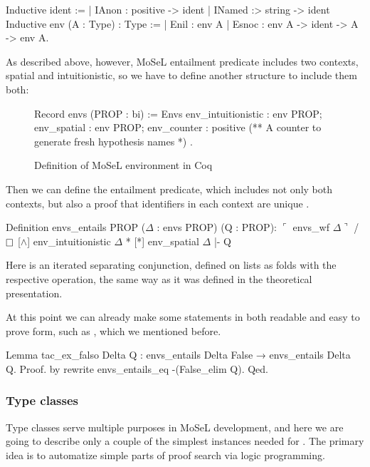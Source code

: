 \begin{coq}
Inductive ident :=
  | IAnon : positive -> ident
  | INamed :> string -> ident
Inductive env (A : Type) : Type :=
  | Enil : env A
  | Esnoc : env A -> ident -> A -> env A.
\end{coq}

As described above, however, MoSeL entailment predicate includes two contexts, spatial and intuitionistic, so we have to define another structure to include them both:

\begin{figure}[H]
\centering
\begin{coq}
Record envs (PROP : bi) := Envs {
  env_intuitionistic : env PROP;
  env_spatial : env PROP;
  env_counter : positive (** A counter to generate fresh hypothesis names *)
}.
\end{coq}
\caption{Definition of MoSeL environment in Coq}
\label{fig:coq_envs}
\end{figure}


Then we can define the entailment predicate, which includes not only both contexts, but also a proof that identifiers in each context are unique .
\begin{coq}
  Definition envs_entails {PROP} ($\Delta$ : envs PROP) (Q : PROP):
  $\ulcorner$ envs_wf $\Delta \urcorner$ /\ $\mathop{\Box}$ [$\wedge$] env_intuitionistic $\Delta$ * [*] env_spatial $\Delta$ |- Q
\end{coq}

Here \coqe{[*]} is an iterated separating conjunction, defined on lists as folds with the respective operation, the same way as it was defined in the theoretical presentation.

At this point we can already make some statements in both readable and easy to prove form, such as , which we mentioned before.

\begin{coq}
Lemma tac_ex_falso Delta Q : envs_entails Delta False → envs_entails Delta Q.
Proof. by rewrite envs_entails_eq -(False_elim Q). Qed.
\end{coq}

\subsubsection{Type classes}
\label{subsubsec:typeclasses}

Type classes serve multiple purposes in MoSeL development, and here we are going to describe only a couple of the simplest instances needed for .
The primary idea is to automatize simple parts of proof search via logic programming.

